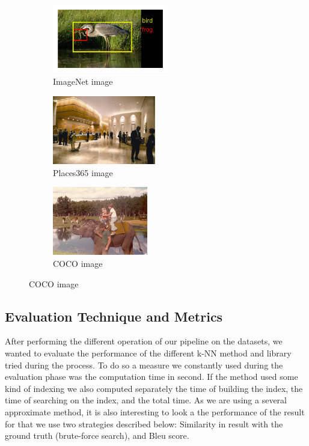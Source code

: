 \documentclass[a4paper]{article}
\begin{document}
\begin{figure}
  \begin{subfigure}[b]{0.32\textwidth}
    \includegraphics[width=\textwidth, height=3cm]{imagenet-img}
    \caption{ImageNet image}
    \label{fig:imagenet-img}
  \end{subfigure}
  \begin{subfigure}[b]{0.32\textwidth}
    \includegraphics[width=\textwidth, height=3cm]{places-img}
    \caption{Places365 image}
    \label{fig:places-img}
  \end{subfigure}
  \begin{subfigure}[b]{0.32\textwidth}
    \includegraphics[width=\textwidth, height=3cm]{coco-img}
    \caption{COCO image}
    \label{fig:coco-img}
  \end{subfigure}
\end{figure}

\subsection{Evaluation Technique and Metrics}

After performing the different operation of our pipeline on the datasets, we wanted to evaluate the performance of the different k-NN method and library tried during the process. To do so a measure we constantly used during the evaluation phase was the computation time in second. If the method used some kind of indexing we also computed separately the time of building the index, the time of searching on the index, and the total time. As we are using a several approximate method, it is also interesting to look a the performance of the result for that we use two strategies described below: Similarity in result with the ground truth (brute-force search), and Bleu score. 
\end{document}
